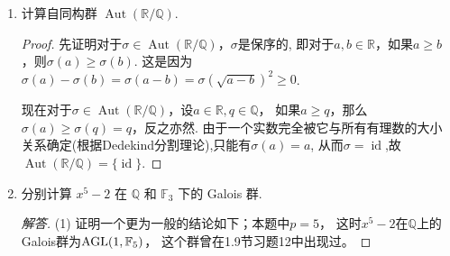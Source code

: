\begin{enumerate}
\item 计算自同构群 $\operatorname{Aut}(\mathbb{R}/\mathbb{Q})$.
\begin{proof}
    先证明对于$\sigma\in \operatorname{Aut}(\mathbb{R}/\mathbb{Q})$，$\sigma$是保序的, 
    即对于$a,b\in\mathbb{R}$，如果$a\geqslant b$，则$\sigma(a)\geqslant\sigma(b)$.
    这是因为$\sigma(a)-\sigma(b)=\sigma(a-b)=\sigma(\sqrt{a-b})^2\geqslant0$.

    现在对于$\sigma\in \operatorname{Aut}(\mathbb{R}/\mathbb{Q})$，设$a\in\mathbb{R},q\in\mathbb{Q}$，
    如果$a\geqslant q$，那么$\sigma(a)\geqslant\sigma(q)=q$，反之亦然.
    由于一个实数完全被它与所有有理数的大小关系确定(根据Dedekind分割理论),只能有$\sigma(a)=a$,
    从而$\sigma = \operatorname{id}$,故$\operatorname{Aut}(\mathbb{R}/\mathbb{Q})=\{\operatorname{id}\}$.
\end{proof}

\item 分别计算 $ x^5 - 2 $ 在 $ \mathbb{Q} $ 和 $ \mathbb{F}_3 $ 下的 Galois 群.
\begin{proof}[解答]
    (1) 证明一个更为一般的结论如下；本题中$p=5$，
    这时$x^5-2$在$\mathbb{Q}$上的Galois群为${\rm AGL}(1,\mathbb{F}_5)$，
    这个群曾在1.9节习题12中出现过。
    

\end{proof}
\end{enumerate}
